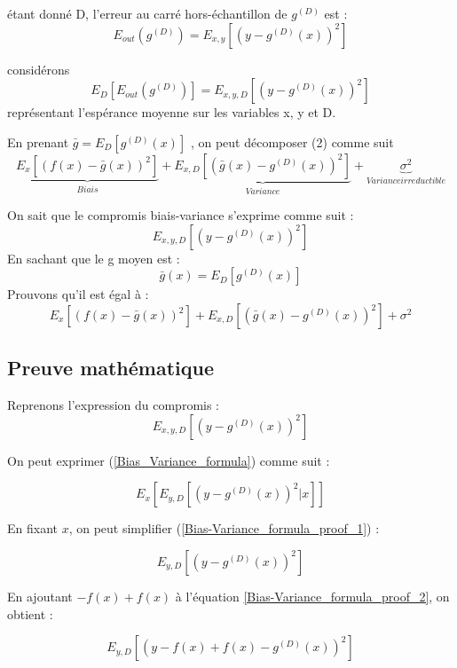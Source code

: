 \documentclass[a4paper]{article}
\begin{document}
étant donné D, l'erreur au carré hors-échantillon de $g^{(D)}$ est :
\[ E_{out}(g^{(D)}) = E_{x,y}[(y - g^{(D)}(x))^2] \]

considérons 
\begin{equation}
E_D[E_{out}(g^{(D)})] = E_{x,y,D}[(y - g^{(D)}(x))^2]
\end{equation}
représentant l'espérance moyenne sur les variables x, y et D.

En prenant $ \bar{g} = E_D[g^{(D)}(x)]$ , on peut décomposer (2) comme suit 
\[ \underbrace{E_x[(f(x) - \bar{g}(x))^2]}_{Biais} + \underbrace{E_{x,D}[(\bar{g}(x) - g^{(D)}(x))^2]}_{Variance} + \underbrace{\sigma^2}_{Variance irreductible} \]

\newpage

On sait que le compromis biais-variance s'exprime comme suit : 
\[ E_{x,y,D}[(y-g^{(D)}(x))^2] \]
En sachant que le g moyen est :
\begin{equation}
\label{g_moyen}
\bar{g}(x) = E_D [g^{(D)}(x)]
\end{equation}
Prouvons qu'il est égal à :
\[ E_x[(f(x) - \bar{g}(x))^2] + E_{x,D}[(\bar{g}(x) - g^{(D)}(x))^2] + \sigma^2 \]

\subsection{Preuve mathématique}

Reprenons l'expression du compromis :
\begin{equation}
\label{Bias_Variance_formula}
E_{x,y,D}[(y-g^{(D)}(x))^2]
\end{equation}

On peut exprimer (\ref{Bias_Variance_formula}) comme suit : 

\begin{equation}
\label{Bias-Variance_formula_proof_1}
E_x [E_{y,D} [(y - g^{(D)}(x))^2 | x]]
\end{equation}

En fixant $x$, on peut simplifier (\ref{Bias-Variance_formula_proof_1}) :

\begin{equation}
\label{Bias-Variance_formula_proof_2}
E_{y,D}[ (y - g^{(D)}(x))^2]
\end{equation}

En ajoutant $ - f(x) + f(x) $ à l'équation \ref{Bias-Variance_formula_proof_2}, on obtient :

\begin{equation}
\label{Bias-Variance_formula_proof_3}
E_{y,D}[ (y - f(x) + f(x) - g^{(D)}(x))^2]
\end{equation}
\end{document}
